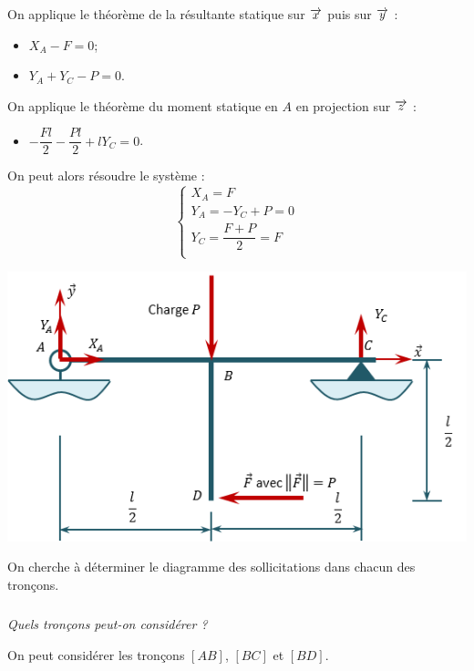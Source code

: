 \documentclass[10pt,fleqn]{article} %
\begin{document}
\begin{multicols}{1}
\begin{corrige}
\begin{minipage}[c]{.47\linewidth}
On applique le théorème de la résultante statique sur $\overrightarrow{x}$ puis sur $\overrightarrow{y}$ :
\begin{itemize}[label=,font=\color{ocre}] 
\item $X_A-F=0$;
\item $Y_A+Y_C-P=0$.
\end{itemize}
On applique le théorème du moment statique en $A$ en projection sur $\overrightarrow{z}$ :
\begin{itemize}[label=,font=\color{ocre}] 
\item $-\dfrac{Fl}{2}-\dfrac{Pl}{2}+lY_C=0$.
\end{itemize}
On peut alors résoudre le système : 
$$
\left\{
\begin{array}{l}
X_A=F \\
Y_A=-Y_C+P = 0 \\
Y_C = \dfrac{F+P}{2} = F\\
\end{array}
\right.
$$
\end{minipage}\hfill
\begin{minipage}[c]{.47\linewidth}
\begin{center}
\includegraphics[width=.95\linewidth]{images/exo_03_corr_01}
\end{center}
\end{minipage}
\end{corrige}
\else 
\fi


On cherche à déterminer le diagramme des sollicitations dans chacun des tronçons.

\subparagraph{}
\textit{Quels tronçons peut-on considérer ?}
\ifprof
\begin{corrige}
On peut considérer les tronçons $[AB]$, $[BC]$ et $[BD]$.
\end{corrige}
\else 
\fi


\end{multicols}
\end{document}
